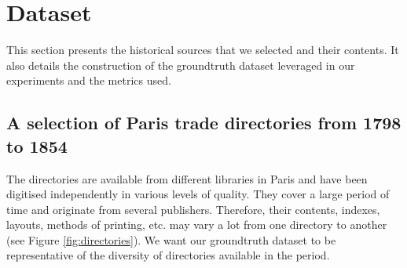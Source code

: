 \section{Dataset}
\label{sec:dataset}






This section presents the historical sources that we selected and their contents. It also details the construction of the groundtruth dataset leveraged in our experiments and the metrics used.

\subsection{A selection of Paris trade directories from 1798 to 1854}

The directories are available from different libraries in Paris and have been digitised independently in various levels of quality. 
They cover a large period of time and originate from several publishers.
Therefore, their contents, indexes, layouts, methods of printing, etc. may vary a lot from one directory to another (see Figure \ref{fig:directories}).
We want our groundtruth dataset to be representative of the diversity of directories available in the period.

